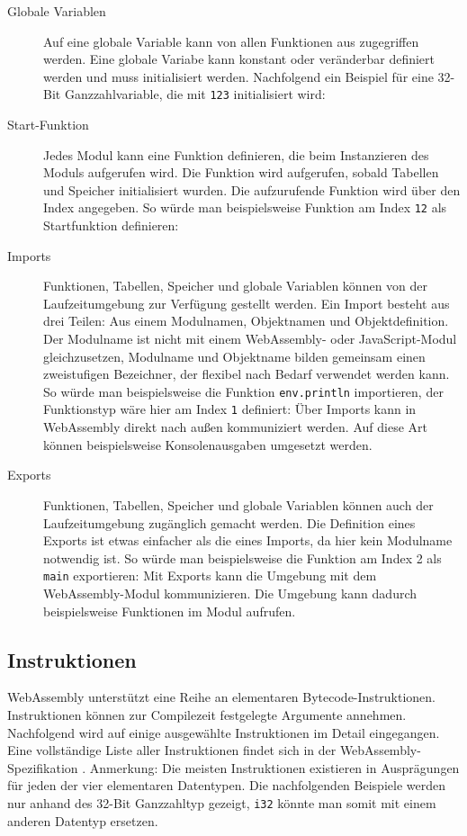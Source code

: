 \begin{description}
    \item[Globale Variablen] Auf eine globale Variable kann von allen Funktionen aus zugegriffen werden. Eine globale Variabe kann konstant oder veränderbar definiert werden und muss initialisiert werden. Nachfolgend ein Beispiel für eine 32-Bit Ganzzahlvariable, die mit \lstinline{123} initialisiert wird: 
    \item[Start-Funktion] Jedes Modul kann eine Funktion definieren, die beim Instanzieren des Moduls aufgerufen wird. Die Funktion wird aufgerufen, sobald Tabellen und Speicher initialisiert wurden. Die aufzurufende Funktion wird über den Index angegeben. So würde man beispielsweise Funktion am Index \lstinline{12} als Startfunktion definieren: 
    \item[Imports] Funktionen, Tabellen, Speicher und globale Variablen können von der Laufzeitumgebung zur Verfügung gestellt werden. Ein Import besteht aus drei Teilen: Aus einem Modulnamen, Objektnamen und Objektdefinition. Der Modulname ist nicht mit einem WebAssembly- oder JavaScript-Modul gleichzusetzen, Modulname und Objektname bilden gemeinsam einen zweistufigen Bezeichner, der flexibel nach Bedarf verwendet werden kann. So würde man beispielsweise die Funktion \lstinline{env.println} importieren, der Funktionstyp wäre hier am Index \lstinline{1} definiert: 
    Über Imports kann in WebAssembly direkt nach außen kommuniziert werden. Auf diese Art können beispielsweise Konsolenausgaben umgesetzt werden.
    \item[Exports] Funktionen, Tabellen, Speicher und globale Variablen können auch der Laufzeitumgebung zugänglich gemacht werden. Die Definition eines Exports ist etwas einfacher als die eines Imports, da hier kein Modulname notwendig ist. So würde man beispielsweise die Funktion am Index 2 als \lstinline{main} exportieren: 
    Mit Exports kann die Umgebung mit dem WebAssembly-Modul kommunizieren. Die Umgebung kann dadurch beispielsweise Funktionen im Modul aufrufen.
\end{description}

\subsection{Instruktionen}
\label{subsec:WebAssembly-Instruktionen}
WebAssembly unterstützt eine Reihe an elementaren Bytecode-Instruktionen. Instruktionen können zur Compilezeit festgelegte Argumente annehmen. Nachfolgend wird auf einige ausgewählte Instruktionen im Detail eingegangen. Eine vollständige Liste aller Instruktionen findet sich in der WebAssembly-Spezifikation \cite{WebAssemblySpecification}. Anmerkung: Die meisten Instruktionen existieren in Ausprägungen für jeden der vier elementaren Datentypen. Die nachfolgenden Beispiele werden nur anhand des 32-Bit Ganzzahltyp gezeigt, \lstinline{i32} könnte man somit mit einem anderen Datentyp ersetzen.

